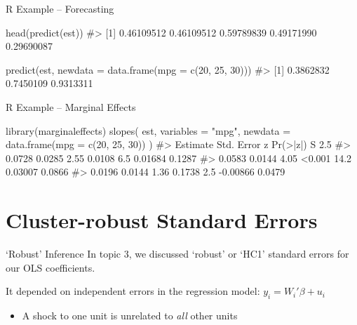 \documentclass[aspectratio=169,t,11pt,table]{beamer}
\begin{document}

\begin{frame}[fragile]{R Example -- Forecasting}
  \begin{codeblock}
head(predict(est))
#> [1] 0.46109512 0.46109512 0.59789839 0.49171990 0.29690087 

predict(est, newdata = data.frame(mpg = c(20, 25, 30)))
#> [1] 0.3862832 0.7450109 0.9313311
  \end{codeblock}
\end{frame}

\begin{frame}[fragile]{R Example -- Marginal Effects}
  \begin{codeblock}
library(marginaleffects)
slopes(
  est, variables = "mpg",
  newdata = data.frame(mpg = c(20, 25, 30))
)
#> Estimate  Std. Error     z  Pr(>|z|)     S     2.5 %
#>   0.0728      0.0285  2.55    0.0108   6.5   0.01684  0.1287
#>   0.0583      0.0144  4.05    <0.001  14.2   0.03007  0.0866
#>   0.0196      0.0144  1.36    0.1738   2.5  -0.00866  0.0479
  \end{codeblock}
\end{frame}






\section{Cluster-robust Standard Errors}

\begin{frame}{`Robust' Inference}
  In topic 3, we discussed `robust' or `HC1' standard errors for our OLS coefficients.

  \bigskip
  It depended on \alert{independent errors} in the regression model:
  $y_i = W_i' \beta + u_i$
  \begin{itemize}
    \item A shock to one unit is unrelated to \emph{all} other units
  \end{itemize}
\end{frame}
\end{document}
